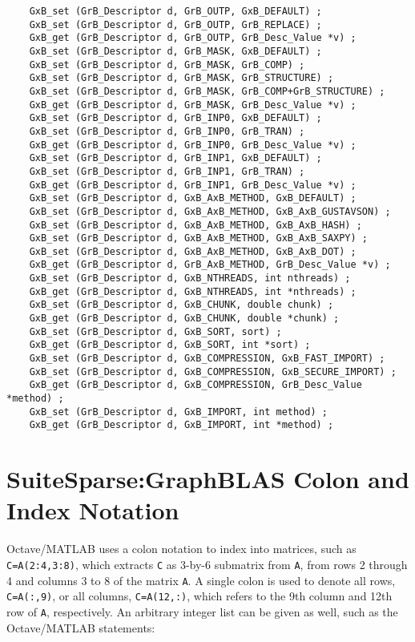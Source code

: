 \documentclass[12pt]{article}
\begin{document}
{    {\footnotesize
    \begin{verbatim}
    GxB_set (GrB_Descriptor d, GrB_OUTP, GxB_DEFAULT) ;
    GxB_set (GrB_Descriptor d, GrB_OUTP, GrB_REPLACE) ;
    GxB_get (GrB_Descriptor d, GrB_OUTP, GrB_Desc_Value *v) ;
    GxB_set (GrB_Descriptor d, GrB_MASK, GxB_DEFAULT) ;
    GxB_set (GrB_Descriptor d, GrB_MASK, GrB_COMP) ;
    GxB_set (GrB_Descriptor d, GrB_MASK, GrB_STRUCTURE) ;
    GxB_set (GrB_Descriptor d, GrB_MASK, GrB_COMP+GrB_STRUCTURE) ;
    GxB_get (GrB_Descriptor d, GrB_MASK, GrB_Desc_Value *v) ;
    GxB_set (GrB_Descriptor d, GrB_INP0, GxB_DEFAULT) ;
    GxB_set (GrB_Descriptor d, GrB_INP0, GrB_TRAN) ;
    GxB_get (GrB_Descriptor d, GrB_INP0, GrB_Desc_Value *v) ;
    GxB_set (GrB_Descriptor d, GrB_INP1, GxB_DEFAULT) ;
    GxB_set (GrB_Descriptor d, GrB_INP1, GrB_TRAN) ;
    GxB_get (GrB_Descriptor d, GrB_INP1, GrB_Desc_Value *v) ;
    GxB_set (GrB_Descriptor d, GxB_AxB_METHOD, GxB_DEFAULT) ;
    GxB_set (GrB_Descriptor d, GxB_AxB_METHOD, GxB_AxB_GUSTAVSON) ;
    GxB_set (GrB_Descriptor d, GxB_AxB_METHOD, GxB_AxB_HASH) ;
    GxB_set (GrB_Descriptor d, GxB_AxB_METHOD, GxB_AxB_SAXPY) ;
    GxB_set (GrB_Descriptor d, GxB_AxB_METHOD, GxB_AxB_DOT) ;
    GxB_get (GrB_Descriptor d, GrB_AxB_METHOD, GrB_Desc_Value *v) ;
    GxB_set (GrB_Descriptor d, GxB_NTHREADS, int nthreads) ;
    GxB_get (GrB_Descriptor d, GxB_NTHREADS, int *nthreads) ;
    GxB_set (GrB_Descriptor d, GxB_CHUNK, double chunk) ;
    GxB_get (GrB_Descriptor d, GxB_CHUNK, double *chunk) ;
    GxB_set (GrB_Descriptor d, GxB_SORT, sort) ;
    GxB_get (GrB_Descriptor d, GxB_SORT, int *sort) ;
    GxB_set (GrB_Descriptor d, GxB_COMPRESSION, GxB_FAST_IMPORT) ;
    GxB_set (GrB_Descriptor d, GxB_COMPRESSION, GxB_SECURE_IMPORT) ;
    GxB_get (GrB_Descriptor d, GxB_COMPRESSION, GrB_Desc_Value *method) ;
    GxB_set (GrB_Descriptor d, GxB_IMPORT, int method) ;
    GxB_get (GrB_Descriptor d, GxB_IMPORT, int *method) ; \end{verbatim} }

\newpage
\section{SuiteSparse:GraphBLAS Colon and Index Notation} %
\label{colon}

Octave/MATLAB uses a colon notation to index into matrices, such as
\verb'C=A(2:4,3:8)', which extracts \verb'C' as 3-by-6 submatrix from \verb'A',
from rows 2 through 4 and columns 3 to 8 of the matrix \verb'A'.  A single
colon is used to denote all rows, \verb'C=A(:,9)', or all columns,
\verb'C=A(12,:)', which refers to the 9th column and 12th row of \verb'A',
respectively.  An arbitrary integer list can be given as well, such as the
Octave/MATLAB statements:

}
\end{document}

